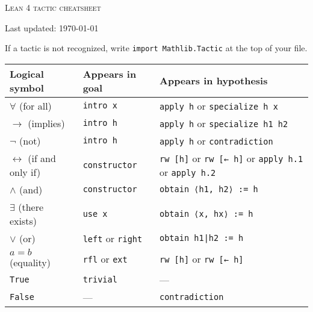 \documentclass[a4paper]{article}
\newcommand{\lean}[1]{{\tt #1}}
\begin{document}
\pagestyle{empty}
\begin{center}
 {\large\textsc{Lean 4 tactic cheatsheet}}

 {\scriptsize Last updated: \today}
\end{center}

\begin{center}
If a tactic is not recognized, write \lean{import Mathlib.Tactic} at the top of your file.\\
\smallskip

\setlength\tabcolsep{5mm}
\def\arraystretch{1.3}
\begin{tabular}{@{}lll@{}}
  \toprule
  Logical symbol & Appears in goal & Appears in hypothesis \\
  \midrule
  $\forall$ (for all) & \lean{intro x} & \lean{apply h} or \lean{specialize h x}  \\
  $\to$ (implies) & \lean{intro h} & \lean{apply h} or \lean{specialize h1 h2} \\
  $\neg$ (not) & \lean{intro h} & \lean{apply h} or \lean{contradiction}  \\
  $\leftrightarrow$ (if and only if)\qquad & \lean{constructor}  & \lean{rw [h]} or \lean{rw [← h]} or \lean{apply h.1} or \lean{apply h.2}\\
  $\wedge$ (and) & \lean{constructor} & \lean{obtain ⟨h1, h2⟩ := h} \\
  $\exists$ (there exists) & \lean{use x} & \lean{obtain ⟨x, hx⟩ := h} \\
  $\vee$ (or) & \lean{left} or \lean{right} & \lean{obtain h1|h2 := h} \\
  $a = b$ (equality) & \lean{rfl} or \lean{ext} & \lean{rw [h]} or \lean{rw [← h]} \\
  \lean{True} & \lean{trivial} & --- \\
  \lean{False} & --- & \lean{contradiction} \\
\bottomrule
\end{tabular}
\end{center}
\end{document}
